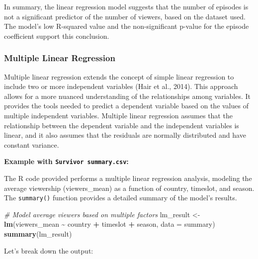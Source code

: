 \documentclass[
]{book}
\newenvironment{Shaded}{\begin{snugshade}}{\end{snugshade}}
\newcommand{\AttributeTok}[1]{\textcolor[rgb]{0.13,0.29,0.53}{#1}}
\newcommand{\CommentTok}[1]{\textcolor[rgb]{0.56,0.35,0.01}{\textit{#1}}}
\newcommand{\FunctionTok}[1]{\textcolor[rgb]{0.13,0.29,0.53}{\textbf{#1}}}
\newcommand{\NormalTok}[1]{#1}
\newcommand{\OtherTok}[1]{\textcolor[rgb]{0.56,0.35,0.01}{#1}}
\newcommand{\SpecialCharTok}[1]{\textcolor[rgb]{0.81,0.36,0.00}{\textbf{#1}}}
\begin{document}
In summary, the linear regression model suggests that the number of episodes is not a significant predictor of the number of viewers, based on the dataset used. The model's low R-squared value and the non-significant p-value for the episode coefficient support this conclusion.

\hypertarget{multiple-linear-regression}{%
\subsubsection*{Multiple Linear Regression}\label{multiple-linear-regression}}

Multiple linear regression extends the concept of simple linear regression to include two or more independent variables (Hair et al., 2014). This approach allows for a more nuanced understanding of the relationships among variables. It provides the tools needed to predict a dependent variable based on the values of multiple independent variables. Multiple linear regression assumes that the relationship between the dependent variable and the independent variables is linear, and it also assumes that the residuals are normally distributed and have constant variance.

\textbf{Example with \texttt{Survivor\ summary.csv}:}

The R code provided performs a multiple linear regression analysis, modeling the average viewership (viewers\_mean) as a function of country, timeslot, and season. The \texttt{summary()} function provides a detailed summary of the model's results.

\begin{Shaded}
\begin{Highlighting}[]
\CommentTok{\# Model average viewers based on multiple factors}
\NormalTok{lm\_result }\OtherTok{\textless{}{-}} \FunctionTok{lm}\NormalTok{(viewers\_mean }\SpecialCharTok{\textasciitilde{}}\NormalTok{ country }\SpecialCharTok{+}\NormalTok{ timeslot }\SpecialCharTok{+}\NormalTok{ season, }\AttributeTok{data =}\NormalTok{ summary)}
\FunctionTok{summary}\NormalTok{(lm\_result)}
\end{Highlighting}
\end{Shaded}

Let's break down the output:
\end{document}

